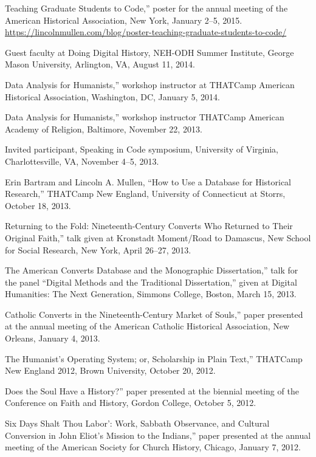 \documentclass[11pt]{article}
\begin{document}
\noindent{}Teaching Graduate Students to Code,'' poster for the annual meeting of the American Historical Association, New York, January 2--5, 2015.  \url{https://lincolnmullen.com/blog/poster-teaching-graduate-students-to-code/}

Guest faculty at Doing Digital History, NEH-ODH Summer Institute, George Mason University, Arlington, VA, August 11, 2014.

\noindent{}Data Analysis for Humanists,'' workshop instructor at THATCamp American Historical Association, Washington, DC, January 5, 2014.

\noindent{}Data Analysis for Humanists,'' workshop instructor THATCamp American Academy of Religion, Baltimore, November 22, 2013.

Invited participant, Speaking in Code symposium, University of Virginia, Charlottesville, VA, November 4--5, 2013.

Erin Bartram and Lincoln A. Mullen, ``How to Use a Database for Historical Research,'' THATCamp New England, University of Connecticut at Storrs, October 18, 2013.

\noindent{}Returning to the Fold: Nineteenth-Century Converts Who Returned to Their Original Faith,'' talk given at Kronstadt Moment/Road to Damascus, New School for Social Research, New York, April 26--27, 2013.

\noindent{}The American Converts Database and the Monographic Dissertation,'' talk for the panel ``Digital Methods and the Traditional Dissertation,'' given at Digital Humanities: The Next Generation, Simmons College, Boston, March 15, 2013.

\noindent{}Catholic Converts in the Nineteenth-Century Market of Souls,'' paper presented at the annual meeting of the American Catholic Historical Association, New Orleans, January 4, 2013.

\noindent{}The Humanist's Operating System; or, Scholarship in Plain Text,'' THATCamp New England 2012, Brown University, October 20, 2012.

\noindent{}Does the Soul Have a History?'' paper presented at the biennial meeting of the Conference on Faith and History, Gordon College, October 5, 2012.

\noindent{}Six Days Shalt Thou Labor': Work, Sabbath Observance, and Cultural Conversion in John Eliot's Mission to the Indians,'' paper presented at the annual meeting of the American Society for Church History, Chicago, January 7, 2012.
\end{document}

